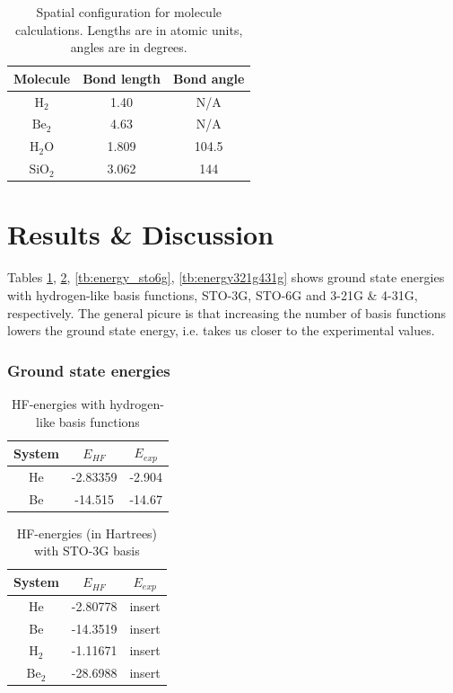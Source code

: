 \documentclass[a4paper,10pt, twocolumn, pre]{revtex4}
\begin{document}
\begin{table}
\caption{Spatial configuration for molecule calculations. Lengths are in atomic units, angles are in degrees.}
\begin{tabular}[c]{c|c|c}
Molecule & Bond length & Bond angle \\
\hline
$\mbox{H}_2$ & 1.40 & N/A \\
$\mbox{Be}_2$ & 4.63 & N/A \\
$\mbox{H}_2\mbox{O}$ & 1.809 & 104.5 \\
$\mbox{SiO}_2$ & 3.062 & 144 \\
\end{tabular}
\end{table}  

\part{Results \& Discussion}

Tables \ref{tb:energy_hydrogenlike}, \ref{tb:energy_sto3g}, \ref{tb:energy_sto6g}, \ref{tb:energy321g431g} shows ground state energies with hydrogen-like basis functions, STO-3G, STO-6G and 3-21G \& 4-31G, respectively. The general picure is that increasing the number of basis functions lowers the ground state energy, i.e. takes us closer to the experimental values. 

\section{Ground state energies}
\begin{table}[h!tb]
\caption{HF-energies with hydrogen-like basis functions}
\label{tb:energy_hydrogenlike}
\begin{tabular}[c]{c|c|c}
System & $E_{HF}$ & $E_{exp}$ \\
\hline
He & -2.83359 & -2.904 \\
Be & -14.515 & -14.67
\end{tabular}
\end{table}

\begin{table}[h!tb]
\caption{HF-energies (in Hartrees) with STO-3G basis}
\label{tb:energy_sto3g}
\begin{tabular}[c]{c|c|c}
System & $E_{HF}$ & $E_{exp}$ \\
\hline
He & -2.80778 & insert \\
Be & -14.3519 & insert \\
$\mbox{H}_2$ & -1.11671 & insert \\
$\mbox{Be}_2$ & -28.6988 & insert \\
\end{tabular}
\end{table}
\end{document}
